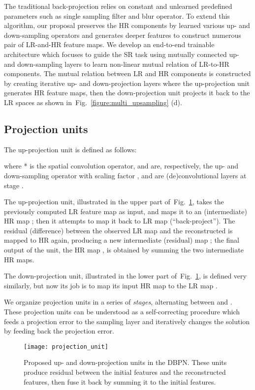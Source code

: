 \documentclass[10pt,journal,compsoc]{IEEEtran}
\begin{document}
The traditional back-projection relies on constant and unlearned predefined parameters such as single sampling filter and blur operator. 
To extend this algorithm, our proposal preserves the HR components by learned various up- and down-sampling operators and generates deeper features to construct numerous pair of LR-and-HR feature maps. 
We develop an end-to-end trainable architecture which focuses to guide the SR task using mutually connected up- and down-sampling layers to learn non-linear mutual relation of LR-to-HR components. 
The mutual relation between LR and HR components is constructed by creating iterative up- and down-projection layers where the up-projection unit generates HR feature maps, then the down-projection unit projects it back to the LR spaces as shown in~Fig.~\ref{figure:multi_upsampling} (d).

\subsection{Projection units}
\label{subsec:projection_unit}


The up-projection unit is defined as follows:

where * is the spatial convolution operator,  and  are, respectively, the up- and
down-sampling operator with scaling factor , and  are (de)convolutional layers at stage .

The up-projection unit, illustrated in the upper part of~Fig.~\ref{figure:projection_unit}, takes the previously computed LR feature map
 as input, and maps it to an (intermediate) HR map ;
then it attempts to map it back to LR map 
(``back-project''). The residual (difference)  between the observed LR map
 and the reconstructed  is mapped to HR again,
producing a new intermediate (residual) map ; the final output of the unit,
the HR map , is obtained by summing the two intermediate HR maps.

The down-projection unit, illustrated in the lower part of~Fig.~\ref{figure:projection_unit}, is defined very similarly, but now its job is
to map its input HR map  to the LR map .


We organize projection units in a series of \emph{stages}, alternating between  and .
These projection units can be understood as a self-correcting procedure which feeds a projection error to the sampling layer and iteratively changes the solution by feeding back the projection error.

\begin{figure}[t!]
\centering
\texttt{[image: projection\_unit]}\vspace{-1em}
\caption{Proposed up- and down-projection units in the DBPN. These units produce residual  between the initial features and the reconstructed features, then fuse it back by summing it to the initial features.}
\label{figure:projection_unit}
\end{figure}
\end{document}
